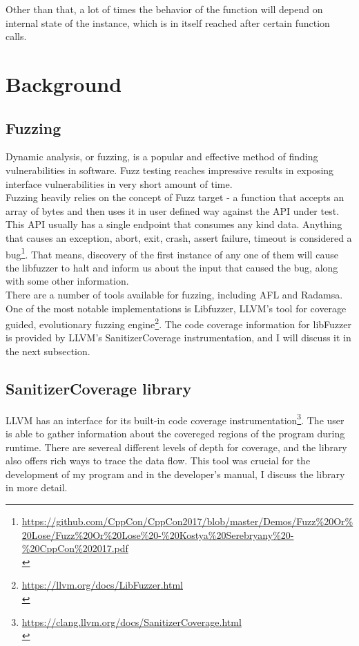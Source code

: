 \documentclass{elteikthesis}[2018/06/06]
\begin{document}
Other than that, a lot of times the behavior of the function will depend on internal state of the instance, which is in itself reached after certain function calls. \\
\section{Background}
\label{sec-1-1}
\subsection{Fuzzing}
\label{sec-1-1-1}
Dynamic analysis, or fuzzing, is a popular and effective method of finding vulnerabilities in software. Fuzz testing reaches impressive results in exposing interface vulnerabilities in very short amount of time. \\

Fuzzing heavily relies on the concept of Fuzz target - a function that accepts an array of bytes and then uses it in user defined way against the API under test. This API usually has a single endpoint that consumes any kind data. Anything that causes an exception, abort, exit, crash, assert failure, timeout is considered a bug\footnote{\url{https://github.com/CppCon/CppCon2017/blob/master/Demos/Fuzz\%20Or\%20Lose/Fuzz\%20Or\%20Lose\%20-\%20Kostya\%20Serebryany\%20-\%20CppCon\%202017.pdf} \\}. That means, discovery of the first instance of any one of them will cause the libfuzzer to halt and inform us about the input that caused the bug, along with some other information. \\

There are a number of tools available for fuzzing, including AFL and Radamsa. One of the most notable implementations is Libfuzzer, LLVM's tool for coverage guided, evolutionary fuzzing engine\footnote{\url{https://llvm.org/docs/LibFuzzer.html} \\}. The code coverage information for libFuzzer is provided by LLVM’s SanitizerCoverage instrumentation, and I will discuss it in the next subsection. \\
\subsection{SanitizerCoverage library}
\label{sec-1-1-2}
LLVM has an interface for its built-in code coverage instrumentation\footnote{\url{https://clang.llvm.org/docs/SanitizerCoverage.html} \\}. The user is able to gather information about the covereged regions of the program during runtime. There are severeal different levels of depth for coverage, and the library also offers rich ways to trace the data flow. This tool was crucial for the development of my program and in the developer's manual, I discuss the library in more detail. \\
\end{document}
